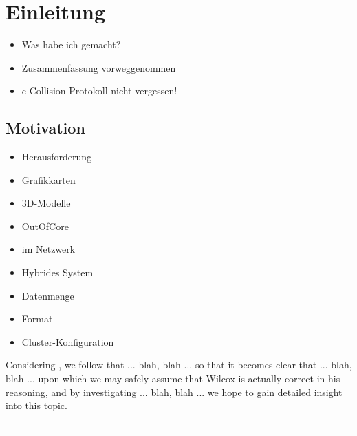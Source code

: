 %
%
%
%
%
%
%
%
%

\chapter{Einleitung}

\begin{itemize}
 \item Was habe ich gemacht?
 \item Zusammenfassung vorweggenommen
 \item c-Collision Protokoll nicht vergessen!
\end{itemize}

\section{Motivation}
\label{introduction:motivation}

\begin{itemize}
 \item Herausforderung
 \item Grafikkarten
 \item 3D-Modelle
 \item OutOfCore
 \item im Netzwerk
 \item Hybrides System
 \item Datenmenge
 \item Format
 \item Cluster-Konfiguration
\end{itemize}

Considering \cite{602108}, we follow that ... blah, blah ... so that it becomes
clear that ... blah, blah ... upon which we may safely assume that Wilcox is
actually correct in his reasoning, and by investigating ... blah, blah ...
we hope to gain detailed insight into this topic.

-


%
%
